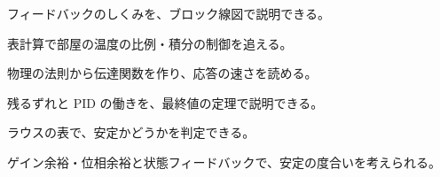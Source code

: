 \begin{furikaeri}
\begin{checklist}
\item フィードバックのしくみを、ブロック線図で説明できる。
\item 表計算で部屋の温度の比例・積分の制御を追える。
\item 物理の法則から伝達関数を作り、応答の速さを読める。
\item 残るずれと PID の働きを、最終値の定理で説明できる。
\item ラウスの表で、安定かどうかを判定できる。
\item ゲイン余裕・位相余裕と状態フィードバックで、安定の度合いを考えられる。
\end{checklist}
\end{furikaeri}
